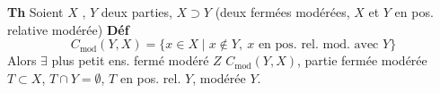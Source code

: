 \documentclass[11pt,a4paper]{article}
\begin{document}
\textbf{Th} Soient $X$ \struck{\ill{}}, $Y$ deux parties, $X \supset Y$ (deux fermées modérées,  $X$ et $Y$ en pos. relative modérée)
 \textbf{Déf}
\[
  C_{\mathrm{mod}}(Y, X) = \{x \in X \mid x \notin Y,\ x \text{ en pos. rel. mod. avec } Y\}
\]
Alors $\exists$ plus petit ens. fermé modéré $Z$   \ill{} $C_{\mathrm{mod}}(Y, X)$, \ill{} partie fermée modérée $T \subset X$, $T \cap Y = \emptyset$, $T$ en pos. rel.  $Y$,    modérée \ill{} $Y$.
\end{document}

